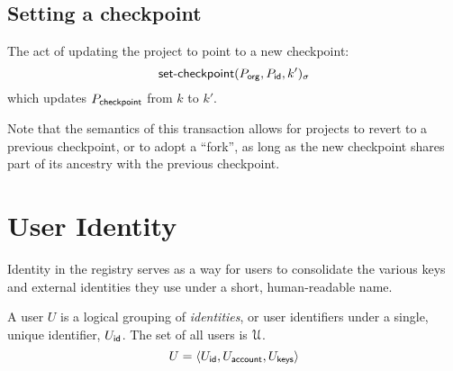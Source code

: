 \subsection{Setting a checkpoint}
The act of updating the project to point to a new checkpoint:
\[
    \operatorname{\mathsf{set-checkpoint}}\lparen P_{\mathsf{org}}, P_{\mathsf{id}}, k'\rparen_\sigma
\]
which updates $P_{\mathsf{checkpoint}}$ from $k$ to $k'$.

Note that the semantics of this transaction allows for projects to revert to
a previous checkpoint, or to adopt a ``fork'', as long as the new checkpoint
shares part of its ancestry with the previous checkpoint.

\section{User Identity}

Identity in the registry serves as a way for users to consolidate the various
keys and external identities they use under a short, human-readable name.

A user $U$ is a logical grouping of {\em identities}, or user identifiers under a
single, unique identifier, $U_{\mathsf{id}}$. The set of all users is $\mathcal{U}$.
\[
    U = \langle U_{\mathsf{id}}, U_{\mathsf{account}}, U_{\mathsf{keys}}\rangle
\]

